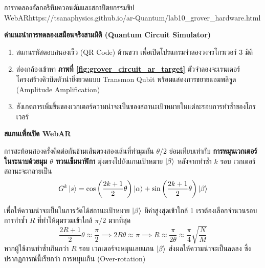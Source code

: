 \begin{qrcodelabbox}{การทดลองอัลกอริทึมควอนตัมและสถาปัตยกรรมชิป WebAR}{https://tsanaphysics.github.io/ar-Quantum/lab10_grover_hardware.html}
\begin{minipage}[c]{0.70\textwidth}
\textbf{คำแนะนำการทดลองเสมือนจริงสามมิติ (Quantum Circuit Simulator)}
\begin{enumerate}
    \item สแกนรหัสตอบสนองเร็ว (QR Code) ด้านขวา เพื่อเปิดโปรแกรมจำลองวงจรโกรเวอร์ 3 มิติ
    \item ส่องกล้องเข้าหา \textbf{ภาพที่ \ref{fig:grover_circuit_ar_target}} ตัวจำลองจะเรนเดอร์โครงสร้างคิวบิตตัวนำยิ่งยวดแบบ Transmon Qubit พร้อมแสดงการขยายแอมพลิจูด (Amplitude Amplification)
    \item สังเกตการเพิ่มขึ้นของเวกเตอร์ความน่าจะเป็นของสถานะเป้าหมายในแต่ละรอบการทำซ้ำของโกรเวอร์
\end{enumerate}
\end{minipage}
\hfill
\begin{minipage}[c]{0.25\textwidth}
\centering
{}
\vspace{4pt}
\scriptsize\textbf{สแกนเพื่อเปิด WebAR}
\end{minipage}
\end{qrcodelabbox}

การสะท้อนสองครั้งติดต่อกันข้ามเส้นตรงสองเส้นที่ทำมุมกัน $\theta/2$ ย่อมเทียบเท่ากับ \textbf{การหมุนเวกเตอร์ในระนาบด้วยมุม $\theta$ ทวนเข็มนาฬิกา} มุ่งตรงไปยังแกนเป้าหมาย $\ket{\beta}$ หลังจากทำซ้ำ $k$ รอบ เวกเตอร์สถานะจะกลายเป็น
\begin{equation}
G^k \ket{s} = \cos\left( \frac{2k+1}{2}\theta \right) \ket{\alpha} + \sin\left( \frac{2k+1}{2}\theta \right) \ket{\beta}
\label{eq:grover_state_k_rotations}
\end{equation}

เพื่อให้ความน่าจะเป็นในการวัดได้สถานะเป้าหมาย $\ket{\beta}$ มีค่าสูงสุดเข้าใกล้ 1 เราต้องเลือกจำนวนรอบการทำซ้ำ $R$ ที่ทำให้มุมรวมเข้าใกล้ $\pi/2$ มากที่สุด
\begin{equation}
\frac{2R+1}{2}\theta \approx \frac{\pi}{2} \implies 2R \theta \approx \pi \implies R \approx \frac{\pi}{2\theta} \approx \frac{\pi}{4}\sqrt{\frac{N}{M}}
\end{equation}
หากผู้ใช้งานทำซ้ำเกินกว่า $R$ รอบ เวกเตอร์จะหมุนเลยแกน $\ket{\beta}$ ส่งผลให้ความน่าจะเป็นลดลง ซึ่งปรากฏการณ์นี้เรียกว่า การหมุนเกิน (Over-rotation)

